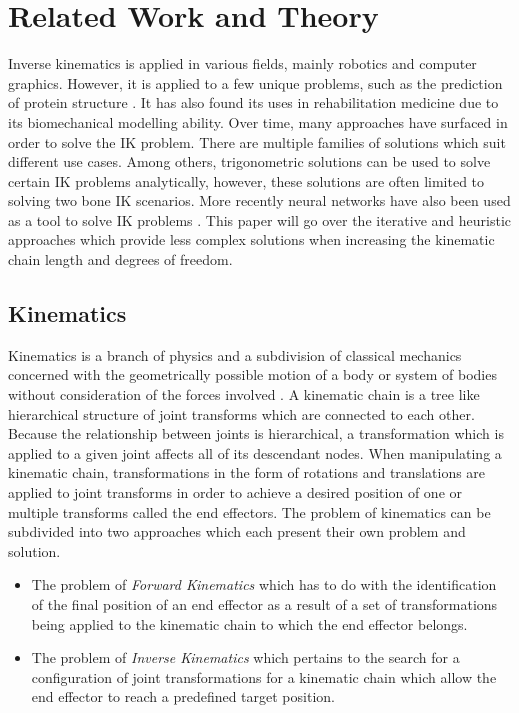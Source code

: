\chapter{Related Work and Theory}
Inverse kinematics is applied in various fields, mainly robotics and computer
graphics. However, it is applied to a few unique problems, such as the
prediction of protein structure \cite{ccd_protein}. It has also found its uses in
rehabilitation medicine due to its biomechanical modelling ability. Over time,
many approaches have surfaced in order to solve the IK problem. There are
multiple families of solutions \cite{Aristidou2011} which suit different use
cases. Among others, trigonometric solutions can be used to solve certain IK
problems analytically, however, these solutions are often limited to solving two
bone IK scenarios. More recently neural networks have also been used as a tool
to solve IK problems \cite{nn_IK}. This paper will go over the iterative and
heuristic approaches which provide less complex solutions when increasing the
kinematic chain length and degrees of freedom.

\section{Kinematics}
Kinematics is a branch of physics and a subdivision of classical mechanics
concerned with the geometrically possible motion of a body or system of bodies
without consideration of the forces involved \cite{kinematics_britannica}.
A kinematic chain is a tree like hierarchical structure of joint transforms
which are connected to each other. Because the relationship between joints is
hierarchical, a transformation which is applied to a given joint affects all of
its descendant nodes. When manipulating a kinematic chain, transformations in
the form of rotations and translations are applied to joint transforms in order
to achieve a desired position of one or multiple transforms called the end
effectors. The problem of kinematics can be subdivided into two approaches which
each present their own problem and solution.

\begin{itemize}
    \item The problem of \textit{Forward Kinematics} which has to do with the
        identification of the final position of an end effector as a result of
        a set of transformations being applied to the kinematic chain to which
        the end effector belongs.
    \item The problem of \textit{Inverse Kinematics} which pertains to the
        search for a configuration of joint transformations for a kinematic
        chain which allow the end effector to reach a predefined target
        position.
\end{itemize}

